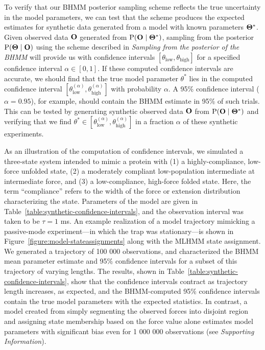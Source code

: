 \documentclass[aps,pre,twocolumn,superscriptaddress,nofootinbib,longbibliography]{revtex4-1}
\newcommand{\bfm}[1]{{\bf #1}}
\renewcommand{\Pr}{\mathrm{P}}
\begin{document}
{To verify that our BHMM posterior sampling scheme reflects the true uncertainty in the model parameters, we can test that the scheme produces the expected estimates for synthetic data generated from a model with known parameters $\bfm{\Theta}^*$. 
Given observed data $\bfm{O}$ generated from $\Pr(\bfm{O} \mid \bfm{\Theta}^*)$, sampling from the posterior $\Pr(\bfm{\Theta} \mid \bfm{O})$ using the scheme described in \color{blue} \emph{Sampling from the posterior of the BHMM} \color{black} will provide us with confidence intervals $[\theta_\mathrm{low}, \theta_\mathrm{high}]$ for a specified confidence interval $\alpha \in [0,1]$.
If these computed confidence intervals are accurate, we should find that the true model parameter $\theta^*$ lies in the computed confidence interval $[\theta^{(\alpha)}_\mathrm{low}, \theta^{(\alpha)}_\mathrm{high}]$ with probability $\alpha$.
A 95\% confidence interval ($\alpha = 0.95$), for example, should contain the BHMM estimate in 95\% of such trials.
This can be tested by generating synthetic observed data $\bfm{O}$ from $\Pr(\bfm{O} \mid \bfm{\Theta}^*)$ and verifying that we find $\theta^* \in [\theta^{(\alpha)}_\mathrm{low}, \theta^{(\alpha)}_\mathrm{high}]$ in a fraction $\alpha$ of these synthetic experiments.

\color{red}
As an illustration of the computation of confidence intervals, we simulated a three-state system intended to mimic a protein with (1) a highly-compliance, low-force unfolded state, (2) a moderately compliant low-population intermediate at intermediate force, and (3) a low-compliance, high-force folded state.
Here, the term ``compliance'' refers to the width of the force or extension distribution characterizing the state.
Parameters of the model are given in Table~\ref{table:synthetic-confidence-intervals}, and the observation interval was taken to be $\tau = 1$ ms.
An example realization of a model trajectory mimicking a passive-mode experiment---in which the trap was stationary---is shown in Figure~\ref{figure:model-stateassignments} along with the MLHMM state assignment.
\color{black}
We generated a trajectory of 100 000 observations, and characterized the BHMM mean parameter estimate and 95\% confidence intervals for a subset of this trajectory of varying lengths.
The results, shown in Table~\ref{table:synthetic-confidence-intervals}, show that the confidence intervals contract as trajectory length increases, as expected, and the BHMM-computed 95\% confidence intervals contain the true model parameters with the expected statistics.
\color{red}
In contrast, a model created from simply segmenting the observed forces into disjoint region and assigning state membership based on the force value alone estimates model parameters with significant bias even for 1 000 000 observations (see \emph{Supporting Information}).
\color{black}

}
\end{document}
